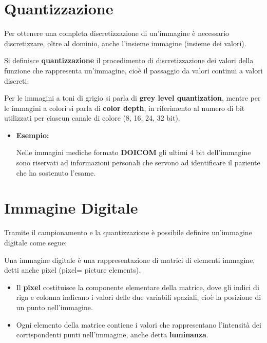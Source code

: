 \section{Quantizzazione}
Per ottenere una completa discretizzazione di un’immagine è necessario
discretizzare, oltre al dominio, anche l’insieme immagine (insieme dei valori).
\begin{definition}
    Si definisce \textbf{quantizzazione} il procedimento di discretizzazione dei
    valori della funzione che rappresenta un’immagine, cioè il passaggio da
    valori continui a valori discreti.
\end{definition}
Per le immagini a toni di grigio si parla di \textbf{grey level quantization},
mentre per le immagini a colori si parla di \textbf{color depth}, in riferimento
al numero di bit utilizzati per ciascun canale di colore (8, 16, 24, 32 bit).
\begin{itemize}
    \item \textbf{Esempio:}

          Nelle immagini mediche formato \textbf{DOICOM} gli ultimi 4 bit
          dell'immagine sono riservati ad informazioni personali che servono ad
          identificare il paziente che ha sostenuto l'esame.
\end{itemize}
\section{Immagine Digitale}
Tramite il campionamento e la quantizzazione è possibile definire un’immagine
digitale come segue:
\begin{definition}
    Una immagine digitale è una rappresentazione di matrici di elementi
    immagine, detti anche pixel (pixel= picture elements).
\end{definition}
\begin{itemize}
    \item Il \textbf{pixel} costituisce la componente elementare della matrice,
          dove gli indici di riga e colonna indicano i valori delle due
          variabili spaziali, cioè la posizione di un punto nell’immagine.
    \item Ogni elemento della matrice contiene i valori che rappresentano
          l’intensità dei corrispondenti punti nell’immagine, anche detta
          \textbf{luminanza}.
\end{itemize}
